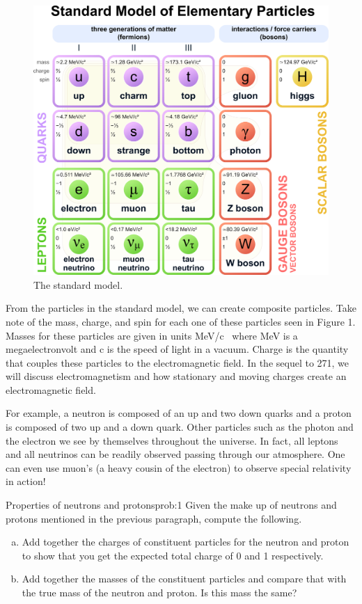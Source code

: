 \documentclass{article}
\begin{document}
\begin{figure}[H]
    \centering
    \includegraphics[width=.6\textwidth]{standard_model.png}
    \caption{The standard model.}
\end{figure}

From the particles in the standard model, we can create composite particles. Take note of the mass, charge, and spin for each one of these particles seen in Figure 1. Masses for these particles are given in units \si[per-mode=symbol]{\mega \electronvolt \per c \squared} where \si{\mega \electronvolt} is a megaelectronvolt and \si{c} is the speed of light in a vacuum. Charge is the quantity that couples these particles to the electromagnetic field.  In the sequel to 271, we will discuss electromagnetism and how stationary and moving charges create an electromagnetic field. 

For example, a neutron is composed of an up and two down quarks and a proton is composed of two up and a down quark. Other particles such as the photon and the electron we see by themselves throughout the universe. In fact, all leptons and all neutrinos can be readily observed passing through our atmosphere. One can even use muon's (a heavy cousin of the electron) to observe special relativity in action! 

\begin{problem}{Properties of neutrons and protons}{prob:1}
Given the make up of neutrons and protons mentioned in the previous paragraph, compute the following.
\begin{enumerate}[(a)]
    \item Add together the charges of constituent particles for the neutron and proton to show that you get the expected total charge of 0 and 1 respectively.
    \item Add together the masses of the constituent particles and compare that with the true mass of the neutron and proton. Is this mass the same?
\end{enumerate}
\end{problem}
\end{document}
